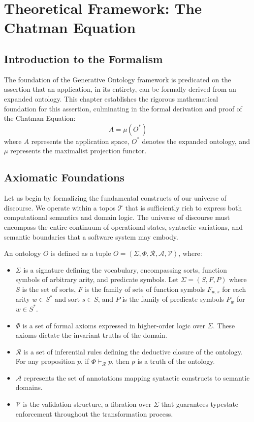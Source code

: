 \chapter{Theoretical Framework: The Chatman Equation}
\label{ch:chatman_equation}

\section{Introduction to the Formalism}

The foundation of the Generative Ontology framework is predicated on the assertion that an application, in its entirety, can be formally derived from an expanded ontology. This chapter establishes the rigorous mathematical foundation for this assertion, culminating in the formal derivation and proof of the Chatman Equation:
\begin{equation}
    A = \mu(O^*)
\end{equation}
where $A$ represents the application space, $O^*$ denotes the expanded ontology, and $\mu$ represents the maximalist projection functor.

\section{Axiomatic Foundations}

Let us begin by formalizing the fundamental constructs of our universe of discourse. We operate within a topos $\mathcal{T}$ that is sufficiently rich to express both computational semantics and domain logic. The universe of discourse must encompass the entire continuum of operational states, syntactic variations, and semantic boundaries that a software system may embody.

\begin{definition}[Ontology $O$]
An ontology $O$ is defined as a tuple $O = (\Sigma, \Phi, \mathcal{R}, \mathcal{A}, \mathcal{V})$, where:
\begin{itemize}
    \item $\Sigma$ is a signature defining the vocabulary, encompassing sorts, function symbols of arbitrary arity, and predicate symbols. Let $\Sigma = (S, F, P)$ where $S$ is the set of sorts, $F$ is the family of sets of function symbols $F_{w,s}$ for each arity $w \in S^*$ and sort $s \in S$, and $P$ is the family of predicate symbols $P_w$ for $w \in S^*$.
    \item $\Phi$ is a set of formal axioms expressed in higher-order logic over $\Sigma$. These axioms dictate the invariant truths of the domain.
    \item $\mathcal{R}$ is a set of inferential rules defining the deductive closure of the ontology. For any proposition $p$, if $\Phi \vdash_{\mathcal{R}} p$, then $p$ is a truth of the ontology.
    \item $\mathcal{A}$ represents the set of annotations mapping syntactic constructs to semantic domains.
    \item $\mathcal{V}$ is the validation structure, a fibration over $\Sigma$ that guarantees typestate enforcement throughout the transformation process.
\end{itemize}
\end{definition}

